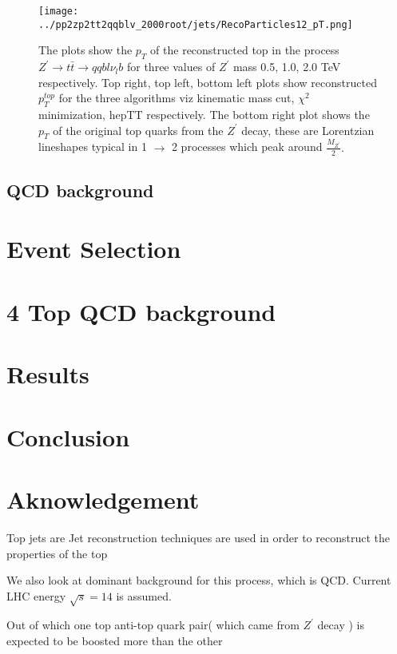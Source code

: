 \documentclass[12pt,a4paper]{article}		%
\begin{document}
\begin{figure}[h]
	\begin{centering}	
		\texttt{[image: ../pp2zp2tt2qqblv\_2000root/jets/RecoParticles12\_pT.png]} 
		\caption{ The plots show the $p_T$ of the reconstructed top in the process $Z^\prime \to t \bar{t} \to qqbl\nu_{l}b$ for three values of $Z^\prime$ mass 0.5, 1.0, 2.0 TeV respectively. Top right, top left, bottom left plots show reconstructed $p_T^{top}$ for the three algorithms viz kinematic mass cut, $\chi^2$ minimization, hepTT respectively. The bottom right plot shows the $p_T$ of the original top quarks from the $Z^\prime$ decay, these are Lorentzian lineshapes typical in 1 $\to$ 2 processes which peak around $\frac{M_{Z^\prime}}{2}.$ }
		\label{toppt}
		\centering
	\end{centering} 		
\end{figure}   

\subsection{QCD background}

\newpage

\section{Event Selection}
\newpage
\section{4 Top QCD background}
\newpage
\section{Results}
\newpage
\section{Conclusion}
\newpage
\section{Aknowledgement}	 
	\newpage 

   Top jets are Jet reconstruction techniques are used in order to reconstruct the properties of the top     

We also look at dominant background for this process, which is QCD.  Current LHC energy $\sqrt{s} = 14$ is assumed. 


Out of which one top anti-top quark pair( which came from $Z^\prime$ decay ) is expected to be boosted more than the other  
\end{document}
